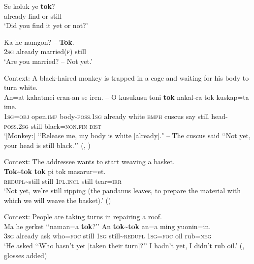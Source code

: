 \begin{exe}
	\ex \label{exAppendixKalamangNotYet1}
	\gll Se koluk ye \textbf{tok}?\\
	already find or still\\
	\glt \lq Did you find it yet or not?' \parencite{Visser2021b}

	\ex\label{exAppendixKalamangNotYet2}
	\gll Ka he namgon? – \textbf{Tok}.\\
	2\textsc{sg} already married(\textsc{f}) {} still\\
	\glt \lq Are you married? -- Not yet.' \parencite[356]{Visser2022}
		
	\ex\label{exAppendixKalamangNotYet3}
	Context: A black-haired monkey is trapped in a cage and waiting for his body to turn white.\\
		\gll An=at kahatmei eran-an se iren. – O kusukusu toni \textbf{tok} nakal-ca tok kuskap=ta ime.\\
		1\textsc{sg}=\textsc{obj} open.\textsc{imp} body-\textsc{poss}.1\textsc{sg} already white {} \textsc{emph} cuscus say still head-\textsc{poss}.2\textsc{sg} still black=\textsc{non}.\textsc{fin} \textsc{dist}\\
		\glt \lq [Monkey:] \lq\lq Release me, my body is white [already]." -- The cuscus said \lq\lq Not yet, your head is still black."' (\cite[222]{Visser2021a}, \citeyear[356]{Visser2022})

	\ex\label{exAppendixKalamangNotYet4}
	Context: The addressee wants to start weaving a basket.\\
	\gll \textbf{Tok\sim{}tok} \textbf{tok} pi tok masarur=et.\\
	\textsc{redupl}\sim{}still still 1\textsc{pl}.\textsc{incl} still tear=\textsc{irr}\\
	\glt \lq Not yet, we're still ripping (the pandanus leaves, to prepare the material with which we will weave the basket).' (\cite{Visser2021b})

	\ex \label{exAppendixKalamangNotYet5}
	Context: People are taking turns in repairing a roof.\\
	\gll Ma he gerket \lq\lq{}naman=a \textbf{tok}?\rq\rq{} An \textbf{tok\sim tok} an=a ming yuonin=in.\\
3\textsc{sg} already ask \phantom{\lq\lq}who=\textsc{foc} still 1\textsc{sg} still\sim \textsc{redupl} 1\textsc{sg}=\textsc{foc} oil rub=\textsc{neg}\\
\glt \lq He asked \lq\lq{}Who hasn’t yet [taken their turn]?\rq\rq{ }I hadn’t yet, I didn’t rub oil.' (\cite{Visser2021b}, glosses added)
\end{exe}

